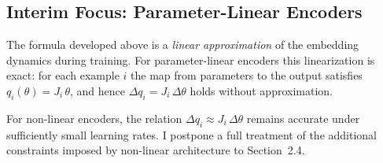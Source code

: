 \subsection{Interim Focus: Parameter-Linear Encoders}

The formula developed above is a \emph{linear approximation} of the embedding dynamics during training. For parameter-linear encoders this linearization is exact: for each example $i$ the map from parameters to the output satisfies $q_i(\theta)=J_i\,\theta$, and hence $\Delta q_i = J_i\,\Delta\theta$ holds without approximation.

For non-linear encoders, the relation $\Delta q_i \approx J_i\,\Delta\theta$ remains accurate under sufficiently small learning rates. I postpone a full treatment of the additional constraints imposed by non-linear architecture to Section~2.4.

